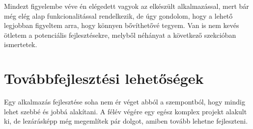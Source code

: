 Mindezt figyelembe véve én elégedett vagyok az elkészült alkalmazással, mert bár még elég alap funkcionalitással rendelkezik, de úgy gondolom, hogy a lehető legjobban figyeltem arra, hogy könnyen bővíthetővé tegyem. Van is nem kevés ötletem a potenciális fejlesztésekre, melyből néhányat a következő szekcióban ismertetek. 

\section{Továbbfejlesztési lehetőségek}

Egy alkalmazás fejlesztése soha nem ér véget abból a szempontból, hogy mindig lehet szebbé és jobbá alakítani. A félév végére egy egész komplex projekt alakult ki, de lezárásképp még megemlítek pár dolgot, amiben tovább lehetne fejleszteni.